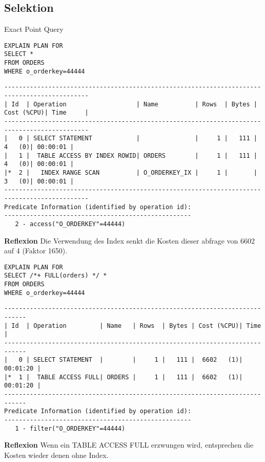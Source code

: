 \documentclass[10pt]{article}
\begin{document}
\subsection{Selektion}
Exact Point Query
\begin{lstlisting}[style=sql]
EXPLAIN PLAN FOR
SELECT *
FROM ORDERS
WHERE o_orderkey=44444
\end{lstlisting}
\begin{lstlisting}[style=queryexecutionplan]
---------------------------------------------------------------------------------------------
| Id  | Operation                   | Name          | Rows  | Bytes | Cost (%CPU)| Time     |
---------------------------------------------------------------------------------------------
|   0 | SELECT STATEMENT            |               |     1 |   111 |     4   (0)| 00:00:01 |
|   1 |  TABLE ACCESS BY INDEX ROWID| ORDERS        |     1 |   111 |     4   (0)| 00:00:01 |
|*  2 |   INDEX RANGE SCAN          | O_ORDERKEY_IX |     1 |       |     3   (0)| 00:00:01 |
---------------------------------------------------------------------------------------------
Predicate Information (identified by operation id):
---------------------------------------------------
   2 - access("O_ORDERKEY"=44444)
\end{lstlisting}

\textbf{Reflexion} \newline
Die Verwendung des Index senkt die Kosten dieser abfrage von 6602 auf 4 (Faktor 1650).
\newpage
\begin{lstlisting}[style=sql]
EXPLAIN PLAN FOR
SELECT /*+ FULL(orders) */ *
FROM ORDERS
WHERE o_orderkey=44444
\end{lstlisting}
\begin{lstlisting}[style=queryexecutionplan]
----------------------------------------------------------------------------
| Id  | Operation         | Name   | Rows  | Bytes | Cost (%CPU)| Time     |
----------------------------------------------------------------------------
|   0 | SELECT STATEMENT  |        |     1 |   111 |  6602   (1)| 00:01:20 |
|*  1 |  TABLE ACCESS FULL| ORDERS |     1 |   111 |  6602   (1)| 00:01:20 |
----------------------------------------------------------------------------
Predicate Information (identified by operation id):
---------------------------------------------------
   1 - filter("O_ORDERKEY"=44444)
\end{lstlisting}
\textbf{Reflexion} \newline
Wenn ein TABLE ACCESS FULL erzwungen wird, entsprechen die Kosten wieder denen ohne Index.
\end{document}
